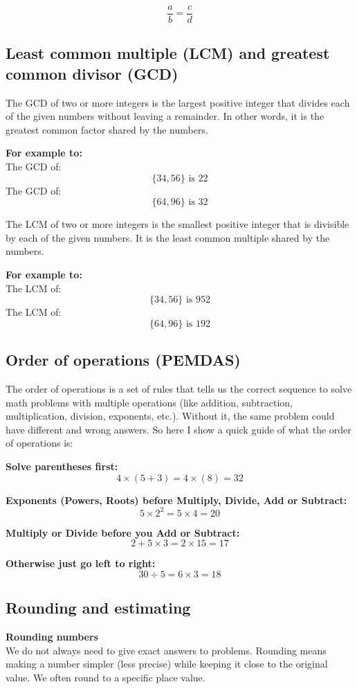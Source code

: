 \documentclass{article} %
\begin{document}
\[
\frac{a}{b} = \frac{c}{d}
\]

\subsection{Least common multiple (LCM) and greatest common divisor (GCD)}
The GCD of two or more integers is the largest positive integer that divides each of the given numbers without leaving a remainder. In other words, it is the greatest common factor shared by the numbers.

\textbf{For example to:}\\
\noindent The GCD of:
\[
\{34, 56\} \text{ is } 22
\]
\noindent The GCD of:
\[
\{64, 96\} \text{ is } 32
\]

The LCM of two or more integers is the smallest positive integer that is divisible by each of the given numbers. It is the least common multiple shared by the numbers.

\textbf{For example to:}\\
\noindent The LCM of:
\[
\{34, 56\} \text{ is } 952
\]
\noindent The LCM of:
\[
\{64, 96\} \text{ is } 192
\]


\subsection{Order of operations (PEMDAS)}
The order of operations is a set of rules that tells us the correct sequence to solve math problems with multiple operations (like addition, subtraction, multiplication, division, exponents, etc.). Without it, the same problem could have different and wrong answers.
So here I show a quick guide of what the order of operations is:

\textbf{Solve parentheses first:}\\
\[
4 \times (5 + 3) = 4 \times (8) = 32
\]

\textbf{Exponents (Powers, Roots) before Multiply, Divide, Add or Subtract:}\\
\[
5 \times 2^{2} = 5 \times 4 = 20
\]

\textbf{Multiply or Divide before you Add or Subtract:}\\
\[
2 + 5 \times 3 = 2 \times 15 = 17 
\]

\textbf{Otherwise just go left to right:}\\
\[
30 \div 5 = 6 \times 3 = 18
\]

\subsection{Rounding and estimating}
\textbf{Rounding numbers}\\
We do not always need to give exact answers to problems. Rounding means making a number simpler (less precise) while keeping it close to the original value. We often round to a specific place value.
\end{document}
